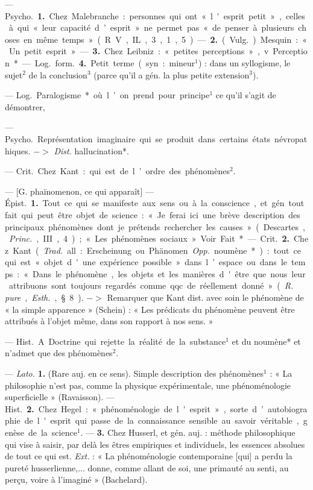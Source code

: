 \begin{itemize}[leftmargin=1cm, label=, itemsep=1pt]
 — \si{Psycho.} {\bf 1.} Chez Malebranche :
personnes qui ont « l'esprit petit »,
celles à qui « leur capacité d’esprit »
ne permet pas « de penser à plusieurs choses en même temps »
(R. V., IL, 3, 1, 5). — {\bf 2.} (\si{Vulg.})
Mesquin : « Un petit esprit ». — {\bf 3.}
Chez Leibniz : « petites perceptions »,
v. Perception*.

— \si{Log.} \si{form.} {\bf 4.} Petit terme (syn. :
mineur$^1$) : dans un syllogisme, le
sujet$^2$ de la conclusion$^3$ (parce qu’il
a gén. la plus petite extension$^3$).

 — \si{Log.} Paralogisme* où l’on prend pour principe$^1$
ce qu'il s’agit de démontrer,

 — \si{Psycho.} Représentation imaginaire qui se produit dans
certains états névropathiques.
$->$ {\it Dist.} hallucination*.

 — \si{Crit.} Chez Kant : qui
est de l’ordre des phénomènes$^2$.

 — [G. phaïnomenon, ce qui
apparaît] — \si{Épist.} {\bf 1.} Tout ce qui
se manifeste aux sens ou à la conscience, et gén. tout fait qui peut
être objet de science : « Je ferai ici
une brève description des principaux
phénomènes dont je prétends rechercher les causes » (Descartes, {\it Princ.},
III, 4) ; « Les phénomènes sociaux ».
Voir Fait*.

— \si{Crit.} {\bf 2.} Chez Kant ({\it Trad.} all. :
Erscheinung ou Phänomen. {\it Opp.}
noumène*) : tout ce qui est « objet
d'une expérience possible » dans
l’espace ou dans le temps : « Dans
le phénomène, les objets et les manières d'être que nous leur attribuons sont toujours regardés comme
qqc. de réellement donné » ({\it R. pure},
{\it Esth.}, § 8). $->$ Remarquer que
Kant dist. avec soin le phénomène
de « la simple apparence » (Schein) :
« Les prédicats du phénomène peuvent être attribués à l’objet même,
dans son rapport à nos sens. »

 — \si{Hist.} A. Doctrine
qui rejette la réalité de la substance$^1$
et du noumène* et n’admet que des
phénomènes$^2$.

 — {\it Lato.} {\bf 1.} (Rare
auj. en ce sens). Simple description
des phénomènes$^1$ : « La philosophie
n’est pas, comme la physique expérimentale,
une phénoménologie superficielle » (Ravaisson). — \si{Hist.}
 {\bf 2.} Chez Hegel : « phénoménologie de
l'esprit », sorte d’autobiographie de
l'esprit qui passe de la connaissance
sensible au savoir véritable, genèse
de la science$^1$. — {\bf 3.} Chez Husserl, et
gén. auj. : méthode philosophique
qui vise à saisir, par delà les êtres
empiriques et individuels, les
essences absolues de tout ce qui est.
{\it Ext.} : « La phénoménologie contemporaine [qui] a perdu la pureté husserlienne,... donne, comme allant de
soi, une primauté au senti, au perçu,
voire à l’imaginé » (Bachelard).


\end{itemize}
